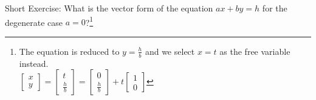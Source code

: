 Short Exercise: What is the vector form of the equation $ax + by = h$ for the degenerate case $a=0$?\footnote{The equation is reduced to $y = \frac{h}{b}$ and we select $x = t$ as the free variable instead.\\ 
$\begin{bmatrix}
x \\
y
\end{bmatrix}
=
\begin{bmatrix}
t \\
\frac{h}{b}
\end{bmatrix}
=
\begin{bmatrix}
0 \\
\frac{h}{b}
\end{bmatrix}
+
t
\begin{bmatrix}
1 \\
0
\end{bmatrix}$}

